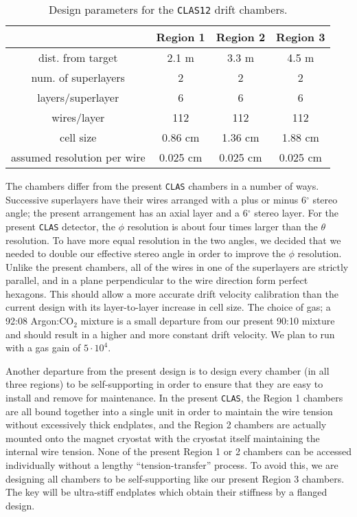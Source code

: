 \begin{table}[htbp]
\begin{center}
\begin{tabular} {||c|c|c|c||} \hline \hline
&{\bf Region 1}      &  {\bf Region 2} & {\bf Region 3}\\ \hline
dist. from target    & 2.1 m & 3.3 m   & 4.5 m \\ \hline
num. of superlayers  & 2 & 2   & 2 \\ \hline
layers/superlayer    & 6 & 6   & 6 \\ \hline
wires/layer          & 112 & 112   & 112 \\ \hline
cell size            & 0.86 cm & 1.36 cm   & 1.88 cm \\ \hline
assumed resolution per wire  & 0.025 cm & 0.025 cm   & 0.025 cm \\ \hline
\end{tabular}
\caption{\small{Design parameters for the {\tt CLAS12} drift chambers.}}
\label{fwd-dc-design-parms}
\end{center}
\end{table}

The chambers differ from the present {\tt CLAS} chambers in a number of 
ways.  Successive superlayers have their wires arranged with a plus or 
minus 6$^{\circ}$ stereo angle; the present arrangement has an axial layer and 
a 6$^{\circ}$ stereo layer.  For the present {\tt CLAS} detector, the $\phi$ 
resolution is about four times larger than the $\theta$ resolution.  To 
have more equal resolution in the two angles, we decided that we needed to 
double our effective stereo angle in order to improve the  $\phi$ resolution.
Unlike the present chambers, all of the wires in one of the superlayers are
strictly parallel, and in a plane perpendicular to the wire direction form
perfect hexagons.  This should allow a more accurate drift velocity 
calibration than the current design with its layer-to-layer increase in 
cell size.  The choice of gas; a 92:08 Argon:CO$_2$ mixture is a small 
departure from our present 90:10 mixture and should result in a higher and 
more constant drift velocity.  We plan to run with a gas gain of $5\cdot10^4$.

Another departure from the present design is to design every chamber (in 
all three regions) to be self-supporting in order to ensure that they are 
easy to install and remove for maintenance.  In the present {\tt CLAS}, the 
Region 1 chambers are all bound together into a single unit in order to 
maintain the wire tension without excessively thick endplates, and the 
Region 2 chambers are actually mounted onto the magnet cryostat with the 
cryostat itself maintaining the internal wire tension.  None of the present 
Region 1 or 2 chambers can be accessed individually without a lengthy 
``tension-transfer'' process.  To avoid this, we are designing all chambers 
to be self-supporting like our present Region 3 chambers.  The key will be 
ultra-stiff endplates which obtain their stiffness by a flanged design.  

